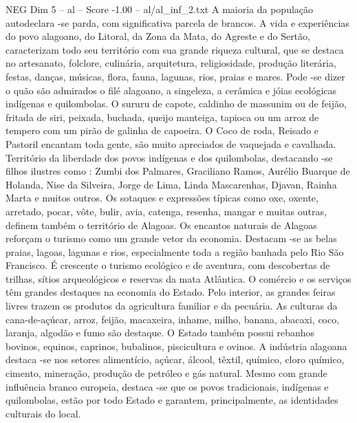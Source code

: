 \begin{textsample}{NEG Dim 5 – al – Score -1.00 – al/al\_inf\_2.txt}
A maioria da população autodeclara -se parda, com significativa parcela de brancos.
A vida e experiências do povo alagoano, do Litoral, da Zona da Mata, do Agreste e do Sertão, caracterizam todo seu território com sua grande riqueza cultural, que se destaca no artesanato, folclore, culinária, arquitetura, religiosidade, produção literária, festas, danças, músicas, flora, fauna, lagunas, rios, praias e mares.
Pode -se dizer o quão são admirados o filé alagoano, a singeleza, a cerâmica e jóias ecológicas indígenas e quilombolas.
O sururu de capote, caldinho de massunim ou de feijão, fritada de siri, peixada, buchada, queijo manteiga, tapioca ou um arroz de tempero com um pirão de galinha de capoeira.
O Coco de roda, Reisado e Pastoril encantam toda gente, são muito apreciados de vaquejada e cavalhada.
Território da liberdade dos povos indígenas e dos quilombolas, destacando -se filhos ilustres como : Zumbi dos Palmares, Graciliano Ramos, Aurélio Buarque de Holanda, Nise da Silveira, Jorge de Lima, Linda Mascarenhas, Djavan, Rainha Marta e muitos outros.
Os sotaques e expressões típicas como oxe, oxente, arretado, pocar, vôte, bulir, avia, catenga, resenha, mangar e muitas outras, definem também o território de Alagoas.
Os encantos naturais de Alagoas reforçam o turismo como um grande vetor da economia.
Destacam -se as belas praias, lagoas, lagunas e rios, especialmente toda a região banhada pelo Rio São Francisco.
É crescente o turismo ecológico e de aventura, com descobertas de trilhas, sítios arqueológicos e reservas da mata Atlântica.
O comércio e os serviços têm grandes destaques na economia do Estado.
Pelo interior, as grandes feiras livres trazem os produtos da agricultura familiar e da pecuária.
As culturas da cana-de-açúcar, arroz, feijão, macaxeira, inhame, milho, banana, abacaxi, coco, laranja, algodão e fumo são destaque.
O Estado também possui rebanhos bovinos, equinos, caprinos, bubalinos, piscicultura e ovinos.
A indústria alagoana destaca -se nos setores alimentício, açúcar, álcool, têxtil, químico, cloro químico, cimento, mineração, produção de petróleo e gás natural.
Mesmo com grande influência branco europeia, destaca -se que os povos tradicionais, indígenas e quilombolas, estão por todo Estado e garantem, principalmente, as identidades culturais do local.

\end{textsample}
